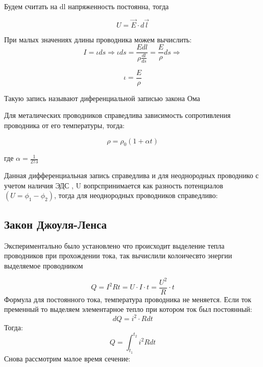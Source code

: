 \documentclass[../main.tex]{subfiles}
\begin{document}
Будем считать на dl напряженность постоянна, тогда

\[U = \vec E \cdot d \vec l\]

При малых значениях длины проводника можем вычислить:
\[I = \iota ds \Rightarrow \iota ds = \frac{E dl}{\rho \frac{dl}{ds}} =  \frac{E}{\rho} ds \Rightarrow\] 

\[\iota = \frac{E}{\rho}\]

 Такую запись называют диференциальной записью закона Ома

Для металических проводников справедлива  зависимость сопротивления проводника от его температуры, тогда:

\[\rho = \rho_0 (1 + \alpha t)\]
\begin{center}
    где $\alpha = \frac{1}{273}$
\end{center}

Данная дифференциальная запись справедлива и для неоднородных проводнико с учетом наличия ЭДС , U вопрспринимается как разность потенциалов $(U = \phi_1 - \phi_2)$, тогда 
для неоднородных проводников справедливо:

\vspace{5px}



\subsection{Закон Джоуля-Ленса}
Экспериментально было установлено что происходит  выделение тепла проводников при прохождении тока, так вычислили колоичесвто энергии выделяемое проводником

\[ Q = I^2 R t = U \cdot I \cdot t = \frac{U^2}{R} \cdot t\]
Формула для постоянного тока, температура проводника не меняется. Если ток пременный то выделяем элементарное тепло при котором ток был постоянный:
\[dQ = i^2 \cdot R dt\]
Тогда:
\[Q = \int_{t_1}^{t_2} i^2 R dt\]
Снова рассмотрим малое время сечение:
\end{document}
